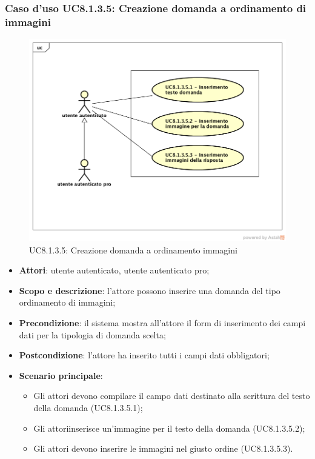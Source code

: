 \subsubsection{Caso d’uso UC8.1.3.5: Creazione domanda a ordinamento di immagini}
\label{UC8.1.3.5}
	\begin{figure}[h]
		\centering
			\includegraphics[scale=0.45,keepaspectratio]{UML/UC8_1_3_5.png}
		\caption{UC8.1.3.5: Creazione domanda a ordinamento immagini}
	\end{figure}
	\FloatBarrier
\begin{itemize}
	\item\textbf{Attori}: utente autenticato, utente autenticato pro;
	\item\textbf{Scopo e descrizione}: l'attore  possono inserire una domanda del tipo ordinamento di immagini;
	\item\textbf{Precondizione}: il sistema mostra all'attore  il form di inserimento dei campi dati per la tipologia di domanda scelta; 
	\item \textbf{Postcondizione}: l'attore ha inserito tutti i campi dati obbligatori;
	\item\textbf{Scenario principale}:
	\begin{itemize}
		\item Gli attori devono compilare il campo dati destinato alla scrittura del testo della domanda (UC8.1.3.5.1);
		\item Gli attoriinserisce un'immagine per il testo della domanda (UC8.1.3.5.2);
		\item Gli attori devono inserire le immagini nel giusto ordine (UC8.1.3.5.3).
	\end{itemize}
\end{itemize}

